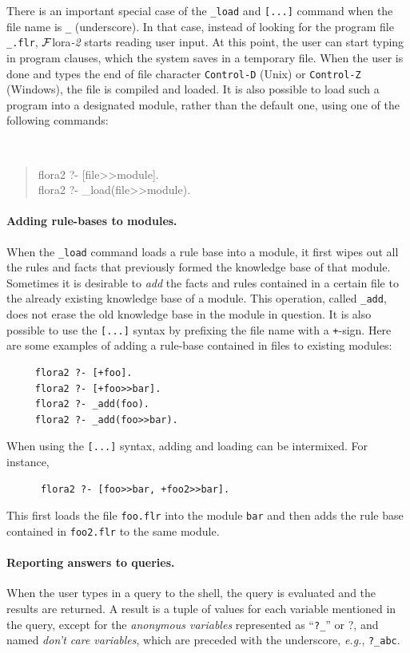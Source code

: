 \documentclass[11pt]{article}
\newcommand{\anon}{?}
\newcommand{\FLORA}{{\mbox{\sc ${\cal F}${lora}\rm\emph{-2}}}\xspace}
\begin{document}
There is an important special case of the {\tt \_load} and {\tt [...]}
command when the file name is {\tt \_} (underscore). In that case, instead
of looking for the program file {\tt \_.flr}, \FLORA starts reading user
input. At this point, the user can start typing in program clauses, which
the system saves in a temporary file. When the user is done and types the
end of file character {\tt Control-D} (Unix) or {\tt Control-Z} (Windows),
the file is compiled and loaded. It is also possible to load such a program
into a designated module, rather than the default one, using one of the
following commands:
{\tt
\begin{quote}
  flora2 ?- [file>>module].\\
  flora2 ?- \_load(file>>module).
\end{quote}
}

\paragraph{Adding rule-bases to modules.}
When the {\tt \_load} command loads a rule base into a module, it first wipes
out all the rules and facts that previously formed the knowledge base of
that module. Sometimes it is desirable to \emph{add} the facts and
rules contained in a certain file to the already existing knowledge base of
a module. This operation, called {\tt \_add}, does not erase the old
knowledge base in the module in question.  It is also possible to use the
{\tt [...]} syntax by prefixing the file name with a {\tt +}-sign. Here are
some examples of adding a rule-base contained in files to existing
modules:
\index{\tt [file]}
\begin{verbatim}
     flora2 ?- [+foo].
     flora2 ?- [+foo>>bar].
     flora2 ?- _add(foo).
     flora2 ?- _add(foo>>bar).
\end{verbatim}
When using the {\tt [...]} syntax, adding and loading can be
intermixed. For instance, 
\begin{verbatim}
      flora2 ?- [foo>>bar, +foo2>>bar].
\end{verbatim}
This first loads the file {\tt foo.flr} into the module {\tt bar} and then
adds the rule base contained in {\tt foo2.flr} to the same module.


\paragraph{Reporting answers to queries.}
When the user types in a query to the shell, the query is evaluated and the
results are returned. A result is a tuple of values for each variable
mentioned in the query, except for the \emph{anonymous variables}
represented as ``{\tt ?\_}'' or \anon, and named {\em don't care
variables}, which are
preceded with the underscore, {\it e.g.}, {\tt ?\_abc}.
\end{document}
